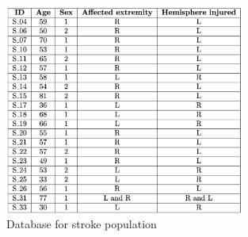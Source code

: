 \begin{figure}[ht]
    \centering
    \includegraphics[width=0.70\textwidth]{appendix/database_stroke.png}
    \caption{Database for stroke population}
    \label{fig: Database stroke}
\end{figure}

\clearpage

\label{pdf: Active-Q questionnaire}

\clearpage